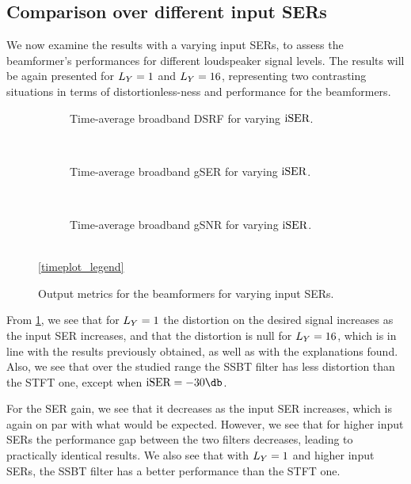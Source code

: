 \subsection{Comparison over different input SERs}

We now examine the results with a varying input SERs, to assess the beamformer's performances for different loudspeaker signal levels. The results will be again presented for $\Ly = 1$ and $\Ly = 16$, representing two contrasting situations in terms of distortionless-ness and performance for the beamformers.


\begin{figure}[!t]
	\centering
	\begin{subfigure}{\textwidth}
		\centering
		
		\caption{Time-average broadband DSRF for varying $\text{iSER}$.}
		\label{subfig:lineplot__DSRF__iSER_var__err_0}
	\end{subfigure}\\[1em]
	\begin{subfigure}{\textwidth}
		\centering
		
		\caption{Time-average broadband gSER for varying $\text{iSER}$.}
		\label{subfig:lineplot__gSER__iSER_var__err_0}
	\end{subfigure}\\[1em]
	\begin{subfigure}{\textwidth}
		\centering
		
		\caption{Time-average broadband gSNR for varying $\text{iSER}$.}
		\label{subfig:lineplot__gSNR__iSER_var__err_0}
	\end{subfigure}\\[1em]
	\ref*{timeplot_legend}
	\caption{Output metrics for the beamformers for varying input SERs.}
	\label{fig:lineplot__iSER_var__Ly_1__err_0}
\end{figure}

From \cref{subfig:lineplot__DSRF__iSER_var__err_0}, we see that for $\Ly = 1$ the distortion on the desired signal increases as the input SER increases, and that the distortion is null for $\Ly = 16$, which is in line with the results previously obtained, as well as with the explanations found. Also, we see that over the studied range the SSBT filter has less distortion than the STFT one, except when $\iser = -30\dB$.

For the SER gain, we see that it decreases as the input SER increases, which is again on par with what would be expected. However, we see that for higher input SERs the performance gap between the two filters decreases, leading to practically identical results. We also see that with $\Ly = 1$ and higher input SERs, the SSBT filter has a better performance than the STFT one.

